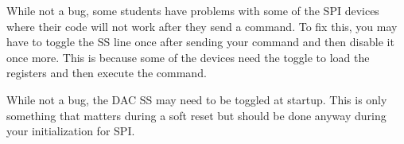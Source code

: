 
\begin{DoxyRefList}
\item[\label{bug__bug000001}%
\hypertarget{bug__bug000001}{}%
File \hyperlink{_s_p_i_8h}{S\-P\-I.h} ]While not a bug, some students have problems with some of the S\-P\-I devices where their code will not work after they send a command. To fix this, you may have to toggle the S\-S line once after sending your command and then disable it once more. This is because some of the devices need the toggle to load the registers and then execute the command.

While not a bug, the D\-A\-C S\-S may need to be toggled at startup. This is only something that matters during a soft reset but should be done anyway during your initialization for S\-P\-I.
\end{DoxyRefList}
